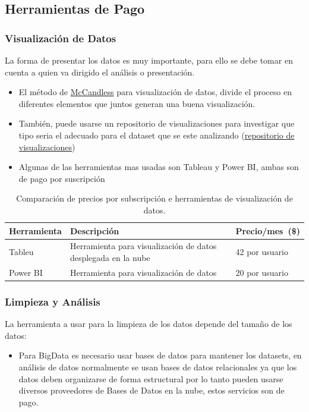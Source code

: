 \documentclass[12pt,a4paper,openright]{article}
\begin{document}
\subsection{Herramientas de Pago}
\subsubsection{Visualizaci\'on de Datos}
La forma de presentar los datos es muy importante, para ello se debe tomar en cuenta a quien va dirigido el análisis o presentación.

\begin{itemize}
    \item El método de \href{https://www.informationisbeautiful.net/visualizations/what-makes-a-good-data-visualization/}{McCandless} para visualización de datos, divide el proceso en diferentes elementos que juntos generan una buena visualización.
    \item También, puede usarse un repositorio de visualizaciones para investigar que tipo seria el adecuado para el dataset que se este analizando (\href{https://informationisbeautiful.net/}{repositorio de visualizaciones})
    \item Algunas de las herramientas mas usadas son Tableau y Power BI, ambas son de pago por suscripción
\end{itemize}

\begin{table}[ht]
\begin{tabular}{|p{4cm}|p{4cm}|p{4cm}|}
\hline
\textbf{Herramienta} & \textbf{Descripci\'on}                                                   & \textbf{Precio/mes\ (\$)} \\ \hline \hline
Tableu      & Herramienta para visualizaci\'on de datos desplegada en la nube & 42 por usuario  \\ \hline
Power BI    & Herramienta para visualizaci\'on de datos                       & 20 por usuario  \\ \hline
\end{tabular}
\caption{Comparaci\'on de precios por subscripci\'on e herramientas de visualizaci\'on de datos.}
\end{table}

\subsubsection{Limpieza y An\'alisis}
La herramienta a usar para la limpieza de los datos depende del tamaño de los datos:
\begin{itemize}
    \item Para BigData es necesario usar bases de datos para mantener los datasets, en análisis de datos normalmente se usan bases de datos relacionales ya que los datos deben organizarse de forma estructural por lo tanto pueden usarse diversos proveedores de Bases de Datos en la nube, estos servicios son de pago.
\end{itemize}
\end{document}
